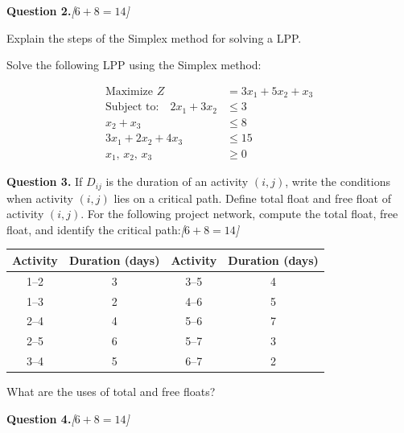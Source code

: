 \documentclass[11pt,a4paper]{article}
\newcommand{\pts}[1]{\hfill   \textit{[#1]}}
\begin{document}
\bigskip




\noindent   \textbf{Question 2.}\pts{$6+8=14$}

\begin{parts}
  \item Explain the steps of the Simplex method for solving a LPP.
  \item Solve the following LPP using the Simplex method:
  
\begin{align*}
     \text{Maximize } Z &= 3x_1 + 5x_2 + x_3 \\
     \text{Subject to:}\quad 2x_1 + 3x_2 &\leq 3 \\
    x_2 + x_3 &\leq 8 \\
    3x_1 + 2x_2 + 4x_3 &\leq 15 \\
    x_1,\, x_2,\, x_3 &\geq 0
  \end{align*}
\end{parts}

\bigskip




\noindent   \textbf{Question 3.} If $D_{ij}$ is the duration of an activity $(i,j)$, write the conditions when activity $(i,j)$ lies on a critical path. Define total float and free float of activity $(i,j)$. For the following project network, compute the total float, free float, and identify the critical path:\pts{$6+8=14$}


\begin{center}

\begin{tabular}{|c|c|c|c|}
\hline
   \textbf{Activity} &   \textbf{Duration (days)} &   \textbf{Activity} &   \textbf{Duration (days)} \\
\hline
1--2 & 3 & 3--5 & 4 \\
1--3 & 2 & 4--6 & 5 \\
2--4 & 4 & 5--6 & 7 \\
2--5 & 6 & 5--7 & 3 \\
3--4 & 5 & 6--7 & 2 \\
\hline
\end{tabular}
\end{center}

What are the uses of total and free floats?

\bigskip




\noindent   \textbf{Question 4.}\pts{$6+8=14$}
\end{document}
